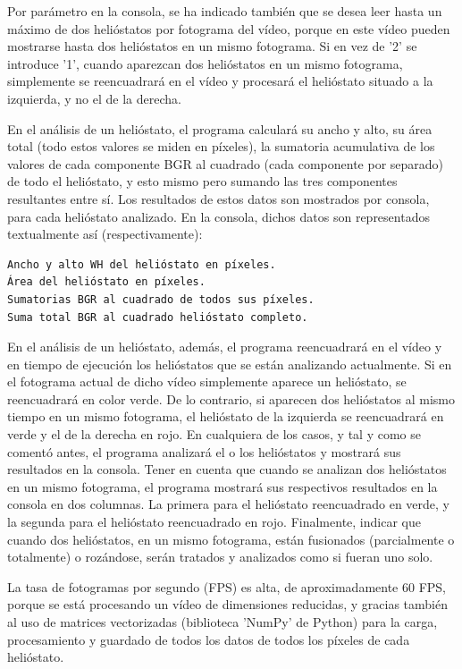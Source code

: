 Por parámetro en la consola, se ha indicado también que se desea leer hasta un máximo de dos helióstatos por fotograma del vídeo, porque en este vídeo pueden mostrarse hasta dos helióstatos en un mismo fotograma. Si en vez de '2' se introduce '1', cuando aparezcan dos helióstatos en un mismo fotograma, simplemente se reencuadrará en el vídeo y procesará el helióstato situado a la izquierda, y no el de la derecha.

En el análisis de un helióstato, el programa calculará su ancho y alto, su área total (todo estos valores se miden en píxeles), la sumatoria acumulativa de los valores de cada componente BGR al cuadrado (cada componente por separado) de todo el helióstato, y esto mismo pero sumando las tres componentes resultantes entre sí. Los resultados de estos datos son mostrados por consola, para cada helióstato analizado. En la consola, dichos datos son representados textualmente así (respectivamente):

\begin{lstlisting}
Ancho y alto WH del helióstato en píxeles.
Área del helióstato en píxeles.
Sumatorias BGR al cuadrado de todos sus píxeles.
Suma total BGR al cuadrado helióstato completo.
\end{lstlisting}

En el análisis de un helióstato, además, el programa reencuadrará en el vídeo y en tiempo de ejecución los helióstatos que se están analizando actualmente. Si en el fotograma actual de dicho vídeo simplemente aparece un helióstato, se reencuadrará en color verde. De lo contrario, si aparecen dos helióstatos al mismo tiempo en un mismo fotograma, el helióstato de la izquierda se reencuadrará en verde y el de la derecha en rojo. En cualquiera de los casos, y tal y como se comentó antes, el programa analizará el o los helióstatos y mostrará sus resultados en la consola. Tener en cuenta que cuando se analizan dos helióstatos en un mismo fotograma, el programa mostrará sus respectivos resultados en la consola en dos columnas. La primera para el helióstato reencuadrado en verde, y la segunda para el helióstato reencuadrado en rojo. Finalmente, indicar que cuando dos helióstatos, en un mismo fotograma, están fusionados (parcialmente o totalmente) o rozándose, serán tratados y analizados como si fueran uno solo.

La tasa de fotogramas por segundo (FPS) es alta, de aproximadamente 60 FPS, porque se está procesando un vídeo de dimensiones reducidas, y gracias también al uso de matrices vectorizadas (biblioteca 'NumPy' de Python) para la carga, procesamiento y guardado de todos los datos de todos los píxeles de cada helióstato.

